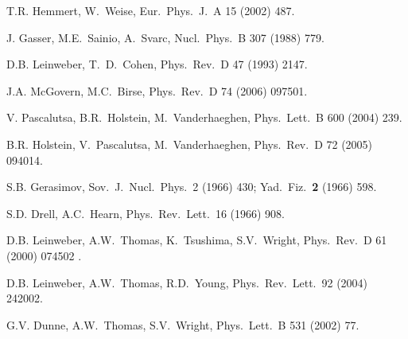 \begin{thebibliography}{PPV06}
  T.R. Hemmert, W.~Weise,
  Eur.\ Phys.\ J.\ A  15 (2002) 487.

  J. Gasser, M.E.~Sainio, A.~Svarc,
  Nucl.\ Phys.\  B  307 (1988) 779.

D.B. Leinweber, T.~D.~Cohen,
  Phys.\ Rev.\ D  47 (1993) 2147. 

  J.A. McGovern, M.C.~Birse,
  Phys.\ Rev.\ D  74 (2006) 097501.

  V. Pascalutsa, B.R.~Holstein, M.~Vanderhaeghen,
  Phys.\ Lett.\ B  600 (2004) 239.

B.R. Holstein, V.~Pascalutsa, M.~Vanderhaeghen,
  Phys.\ Rev.\ D  72 (2005) 094014.

S.B. Gerasimov,
Sov.\ J.\ Nucl.\ Phys.\   2 (1966) 430; Yad.\ Fiz.\  {\bf 2} (1966) 598.

S.D. Drell, A.C.~Hearn,
Phys.\ Rev.\ Lett.\   16 (1966) 908.

  D.B. Leinweber, A.W.~Thomas, K.~Tsushima, S.V.~Wright,
  Phys.\ Rev.\ D  61 (2000) 074502 .

  D.B. Leinweber, A.W.~Thomas, R.D.~Young,
  Phys.\ Rev.\ Lett.\   92 (2004) 242002.

  G.V. Dunne, A.W.~Thomas, S.V.~Wright,
  Phys.\ Lett.\ B  531 (2002) 77.



\end{thebibliography}
